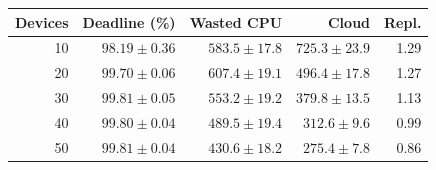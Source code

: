 \begin{tabular}{@{}rrrrr@{}}
\toprule
Devices & Deadline (\%) & Wasted CPU & Cloud & Repl. \\
\midrule
10 & $98.19 \pm 0.36$ & $583.5 \pm 17.8$ & $725.3 \pm 23.9$ & 1.29 \\
20 & $99.70 \pm 0.06$ & $607.4 \pm 19.1$ & $496.4 \pm 17.8$ & 1.27 \\
30 & $99.81 \pm 0.05$ & $553.2 \pm 19.2$ & $379.8 \pm 13.5$ & 1.13 \\
40 & $99.80 \pm 0.04$ & $489.5 \pm 19.4$ & $312.6 \pm 9.6$ & 0.99 \\
50 & $99.81 \pm 0.04$ & $430.6 \pm 18.2$ & $275.4 \pm 7.8$ & 0.86 \\
\bottomrule
\end{tabular}
